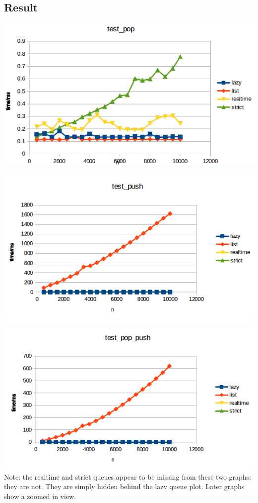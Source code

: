 \subsection{Result}
\includegraphics{Graphs/test_pop.png}


\includegraphics{Graphs/test_push.png}


\includegraphics{Graphs/test_pop_push.png}
Note: the realtime and strict queues appear to be missing from these two graphs: they are not. They are simply hidden behind the lazy queue plot. Later graphs show a zoomed in view.


